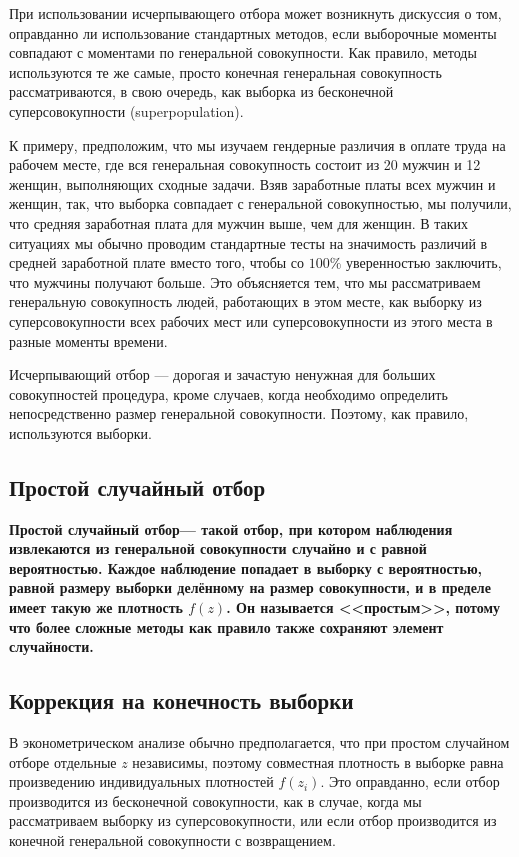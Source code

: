 При использовании исчерпывающего отбора может возникнуть дискуссия о том, оправданно ли использование стандартных методов, если выборочные моменты совпадают с моментами по генеральной совокупности. Как правило, методы используются те же самые, просто конечная генеральная совокупность рассматриваются, в свою очередь, как выборка из бесконечной суперсовокупности (superpopulation).

К примеру, предположим, что мы изучаем гендерные различия в оплате труда на рабочем месте, где вся генеральная совокупность состоит из 20 мужчин и 12 женщин, выполняющих сходные задачи. Взяв заработные платы всех мужчин и женщин, так, что выборка совпадает с генеральной совокупностью, мы получили, что средняя заработная плата для мужчин выше, чем для женщин. В таких ситуациях мы обычно проводим стандартные тесты на значимость различий в средней заработной плате вместо того, чтобы со $100\%$ уверенностью заключить, что мужчины получают больше. Это объясняется тем, что мы рассматриваем генеральную совокупность людей, работающих в этом месте, как выборку из суперсовокупности всех рабочих мест или суперсовокупности из этого места в разные моменты времени. 

Исчерпывающий отбор --- дорогая и зачастую ненужная для больших совокупностей процедура, кроме случаев, когда необходимо определить непосредственно размер генеральной совокупности. Поэтому, как правило, используются выборки.  

\subsection*{Простой случайный отбор}

\bfseries Простой случайный отбор\mdseries  --- такой отбор, при котором наблюдения извлекаются из генеральной совокупности случайно и с равной вероятностью. Каждое наблюдение попадает в выборку с вероятностью, равной размеру выборки делённому на размер совокупности, и в пределе имеет такую же плотность $f(z)$. Он называется <<простым>>, потому что более сложные методы как правило также сохраняют элемент случайности. 

\subsection*{Коррекция на конечность выборки}

В эконометрическом анализе обычно предполагается, что при простом случайном отборе отдельные $z$ независимы, поэтому совместная плотность в выборке равна произведению индивидуальных плотностей $f(z_i)$. Это оправданно, если отбор производится из бесконечной совокупности, как в случае, когда мы рассматриваем выборку из суперсовокупности, или если отбор производится из конечной генеральной совокупности с возвращением.

